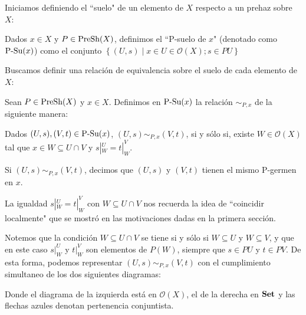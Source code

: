 Iniciamos definiendo el ``suelo" de un elemento de $X$ respecto a un prehaz sobre $X$:
\begin{Def}[$P$-suelo de $x$]
   Dados $x\in X$ y $P\in \normalfont{\text{PreSh}}(X)$, definimos el ``P-suelo de $x$" (denotado como $\normalfont{\text{P-Su}} (x)$) como el conjunto $\left\lbrace (U,s)\mid x\in U\in \mathcal{O}(X); s\in PU\right\rbrace$
\end{Def}
 Buscamos definir una relación de equivalencia sobre el suelo de cada elemento de $X$:
\begin{Def}
   Sean $P\in \normalfont{\text{PreSh}}(X)$ y $x\in X$. Definimos en $\normalfont{\text{P-Su}}(x)$ la relación $\sim_{P,x}$ de la siguiente manera:
   \begin{center}
      Dados $(U,s),(V,t)\in \normalfont{\text{P-Su}}(x)$, $(U,s)\sim_{P,x}(V,t)$, si y sólo si, existe $W\in\mathcal{O}(X)$ tal que $x\in W\subseteq U\cap V$ y $s|^{U}_{W}=t|^{V}_{W}$.
   \end{center}
   Si $(U,s)\sim_{P,x}(V,t)$, decimos que $(U,s)$ y $(V,t)$ tienen el mismo P-germen en $x$. 
\end{Def}
La igualdad $s|^{U}_{W}=t|^{V}_{W}$ con $W\subseteq U\cap V$ nos recuerda la idea de ``coincidir localmente" que se mostró en las motivaciones dadas en la primera sección.

Notemos que la condición $W\subseteq U\cap V$ se tiene si y sólo si $W\subseteq U$ y $W\subseteq V$, y que en este caso $s|^{U}_{W}$ y $t|^{V}_{W}$ son elementos de $P(W)$, siempre que $s\in PU$ y $t\in PV$. De esta forma, podemos representar $(U,s)\sim_{P,x}(V,t)$ con el cumplimiento simultaneo de los dos siguientes diagramas:

Donde el diagrama de la izquierda está en $\mathcal{O}(X)$, el de la derecha en $\normalfont{\textbf{Set}}$ y las flechas azules denotan pertenencia conjuntista.


